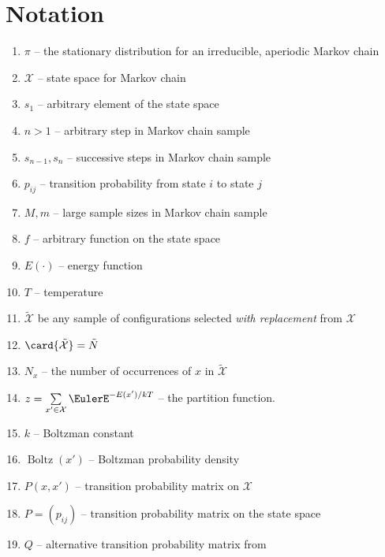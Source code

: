 \documentclass[12pt]{article}
\begin{document}
\hr

\section*{Notation}
\begin{enumerate}
    \item
        \( \pi \) -- the stationary distribution for an irreducible,
        aperiodic Markov chain
    \item
        \( \mathcal{X} \) -- state space for Markov chain
    \item
        \( s_1 \) -- arbitrary element of the state space
    \item
        \( n > 1 \) -- arbitrary step in Markov chain sample
    \item
        \( s_{n-1}, s_n \) -- successive steps in Markov chain sample
    \item
        \( p_{ij} \) -- transition probability from state \( i \) to
        state \( j \)
    \item
        \( M, m \) -- large sample sizes in Markov chain sample
    \item
        \( f \) -- arbitrary function on the state space
    \item
        \( E(\cdot) \) -- energy function
    \item
        \( T \) -- temperature
    \item
        \( \tilde{\mathcal{X}} \) be any sample of configurations
        selected \emph{with replacement} from \( \mathcal{X} \)
    \item
        \( \card{\tilde{\mathcal{X}}} = \tilde{N} \)
    \item
        \( N_{x} \) -- the number of occurrences of \( x \) in \( \tilde
        {\mathcal{X}} \)
    \item
        \( z = \sum\limits_{x' \in \mathcal{X}} \EulerE^{-E(x')/kT} \)
        -- the partition function.
    \item
        \( k \) -- Boltzman constant
    \item
        \(
        \operatorname{Boltz}
        (x') \) -- Boltzman probability density
    \item
        \( P(x,x') \) -- transition probability matrix on \( \mathcal{X}
        \)
    \item
        \( P = (p_{ij}) \) -- transition probability matrix on the state
        space
    \item
        \( Q \) -- alternative transition probability matrix from

\end{enumerate}
\end{document}
